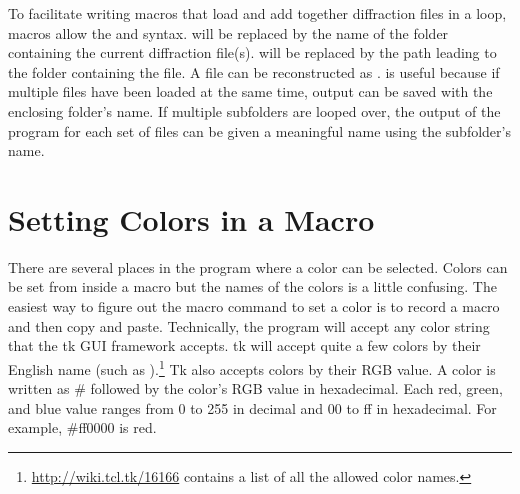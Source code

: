 To facilitate writing macros that load and 
add together diffraction files in a loop, 
macros allow the 
and  syntax.
 will be replaced
by the name of the folder containing the current
diffraction file(s).  
will be replaced by the path leading to the folder 
containing the file. A 
file can be reconstructed as 
.
 is useful because if multiple
files have been loaded at the same time, output can be saved
with the enclosing folder's name. If multiple subfolders
are looped over, the output of the program for each set of 
files can be given a meaningful name using the subfolder's
name.

\section{Setting Colors in a Macro}

There are several places in the program where a
color can be selected. Colors can be set from
inside a macro but the names of the colors is
a little confusing. The easiest way to figure out 
the macro command to set a color is to record a macro
and then copy and paste.
Technically, the program will accept 
any color string that the tk GUI framework accepts. tk
will accept quite a few colors by their English name (such as 
).\footnote{\url{http://wiki.tcl.tk/16166} 
contains a list of all the allowed color names.} 
Tk also accepts colors
by their RGB value. A color is written as \#
followed by the color's RGB value in hexadecimal.
Each red, green, and blue value ranges from 0 to 255 in
decimal and 00 to ff in hexadecimal. For example, \#ff0000 is red. 

